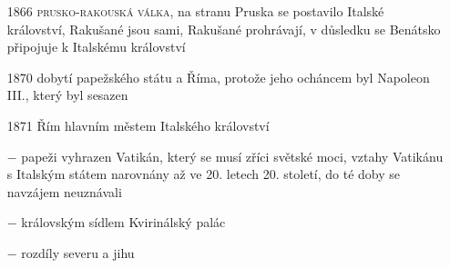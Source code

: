 \documentclass{article}
\begin{document}
\begin{itemize}
    \item[1866] \textsc{prusko-rakouská válka}, na stranu Pruska se postavilo Italské království, Rakušané jsou sami, Rakušané prohrávají, v důsledku se Benátsko připojuje k Italskému království
    \item[1870] dobytí papežského státu a Říma, protože jeho ocháncem byl Napoleon III., který byl sesazen
    \item[1871] Řím hlavním městem Italského království
    \item[$-$] papeži vyhrazen Vatikán, který se musí zříci světské moci, vztahy Vatikánu  s Italským státem narovnány až ve 20. letech 20. století, do té doby se navzájem neuznávali
    \item[$-$] královským sídlem Kvirinálský palác
    \item[$-$] rozdíly severu a jihu
\end{itemize}
\end{document}
